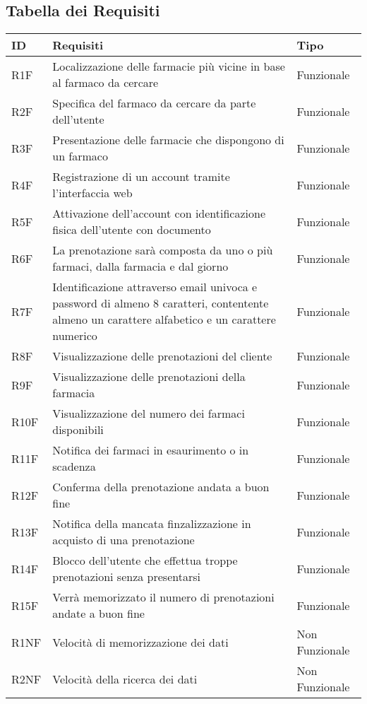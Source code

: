 \subsection{Tabella dei Requisiti}

\begin{tabular} {|P{1.5cm}|P{12.5cm}|P{3cm}|}
\hline
  \textbf{ID} & \textbf{Requisiti} & \textbf{Tipo} \\
\hline
  R1F & Localizzazione delle farmacie più vicine in base al farmaco da cercare & Funzionale \\
\hline
  R2F & Specifica del farmaco da cercare da parte dell'utente & Funzionale \\
\hline
  R3F & Presentazione delle farmacie che dispongono di un farmaco & Funzionale \\
\hline 
  R4F & Registrazione di un account tramite l'interfaccia web & Funzionale\\
\hline
  R5F & Attivazione dell'account con identificazione fisica dell'utente con documento & Funzionale \\
\hline
  R6F & La prenotazione sarà composta da uno o più farmaci, dalla farmacia e dal giorno & Funzionale\\
\hline
  R7F & Identificazione attraverso email univoca e password di almeno 8 caratteri, contentente almeno un carattere alfabetico e un carattere numerico & Funzionale\\
\hline
  R8F & Visualizzazione delle prenotazioni del cliente & Funzionale\\
\hline
  R9F & Visualizzazione delle prenotazioni della farmacia & Funzionale\\
\hline
  R10F & Visualizzazione del numero dei farmaci disponibili & Funzionale\\
\hline
  R11F & Notifica dei farmaci in esaurimento o in scadenza & Funzionale\\
\hline
  R12F & Conferma della prenotazione andata a buon fine & Funzionale\\
\hline
  R13F & Notifica della mancata finzalizzazione in acquisto di una prenotazione & Funzionale\\
\hline
  R14F & Blocco dell'utente che effettua troppe prenotazioni senza presentarsi & Funzionale\\
\hline
  R15F & Verrà memorizzato il numero di prenotazioni andate a buon fine & Funzionale\\
\hline
  R1NF & Velocità di memorizzazione dei dati & Non Funzionale\\
\hline
  R2NF & Velocità della ricerca dei dati & Non Funzionale\\

\end{tabular}
